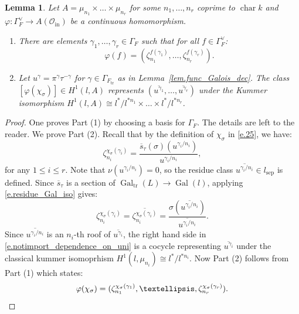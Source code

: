 \documentclass[12pt]{amsart}
\numberwithin{equation}{section}
\newtheorem{lemma}[theorem]{Lemma}
\theoremstyle{definition}
\newcommand{\cO}{\mathcal{O}}
\newcommand{\Gal}{\operatorname{Gal}}
\newcommand{\sep}{\operatorname{sep}}
\newcommand{\Char}{\operatorname{char}}
\newcommand{\tr}{\operatorname{tr}}
\newcommand{\Ftr}{F_{\tr}}
\newcommand{\oin}{\operatorname{in}}
\newcommand{\Oin}{\cO_{\oin}}
\newcommand{\vphi}{\varphi}
\newcommand{\Galtr}{\Gal_{\tr}}
\newcommand{\I}[1]{\Gamma_{#1}^{\vee}}
\begin{document}
\begin{lemma}\label{lem.undertanding_chisigma}
    Let  $A=\mu_{n_1} \times \dots \times \mu_{n_r}$ for some $n_1,\dots,n_r$ coprime to $\Char k$ and $\vphi: \I{F} \to A(\Oin)$ be a continuous homomorphism. 
    \begin{enumerate}
        \item There are elements $\gamma_1,\dots,\gamma_r\in \Gamma_F$ such that for all $f\in \I{F}$:
    \begin{equation}
        \vphi(f) = (\zeta_{n_1}^{f(\gamma_1)},\dots,\zeta_{n_r}^{f(\gamma_r)}).
    \end{equation}
    
        \item Let $u^\gamma = \pi^{\gamma} \tau^{-\gamma}$ for $\gamma\in \Gamma_{\Ftr}$ as in Lemma~\ref{lem.func_Galois_dec}. The class $[\vphi(\chi_\sigma)]\in H^1(l,A)$ represents $(\overline{u^{\gamma_1}},\dots,\overline{u^{\gamma_r}})$ under the Kummer isomorphism $ H^1(l,A)\cong l^*/l^{*n_1}\times \dots\times l^*/l^{*n_r}$.

    \end{enumerate}
    
\end{lemma}
\begin{proof}
    One proves Part (1) by choosing a basis for $\Gamma_F$. The details are left to the reader. We prove Part (2). Recall that by the definition of $\chi_\sigma$ in \eqref{e.25}, we have:
    $$\zeta_{n_i}^{\chi_\sigma(\gamma_i)} = \frac{\overline{s}_\tau(\sigma)(u^{\gamma_i/n_i})}{u^{\gamma_i/n_i}},$$
    for any $1\leq i \leq r$.
    Note that $\nu(u^{\gamma_i/n_i})=0$, so the residue class $\overline{u^{\gamma_i/n_i}} \in l_{\sep}$ is defined. 
    Since $\overline{s}_\tau$ is a section of $\Galtr(L)\to \Gal(l)$, applying \eqref{e.residue_Gal_iso} gives:
    \begin{equation}\label{e.notimport_dependence_on_uni}
        \zeta_{n_i}^{\chi_\sigma(\gamma_i)} = \overline{\zeta_{n_i}^{\chi_\sigma(\gamma_i)}} = \frac{\sigma(\overline{u^{\gamma_i/n_i}})}{\overline{u^{\gamma_i/n_i}}}.
    \end{equation}
     Since $\overline{u^{\gamma_i/n_i}}$ is an $n_i$-th roof of $\overline{u^{\gamma_i}}$, the right hand side in \eqref{e.notimport_dependence_on_uni} is a cocycle representing $\overline{u^{\gamma_i}}$ under the classical kummer isomoprhism $H^1(l,\mu_{n_i})\cong l^*/l^{*n_i}$.
    Now Part (2) follows from Part (1) which states:
    \[\vphi(\chi_\sigma) = (\zeta_{n_1}^{\chi_\sigma(\gamma_1)},\dots,\zeta_{n_r}^{\chi_\sigma(\gamma_r)}).\qedhere\]
\end{proof}
\end{document}
